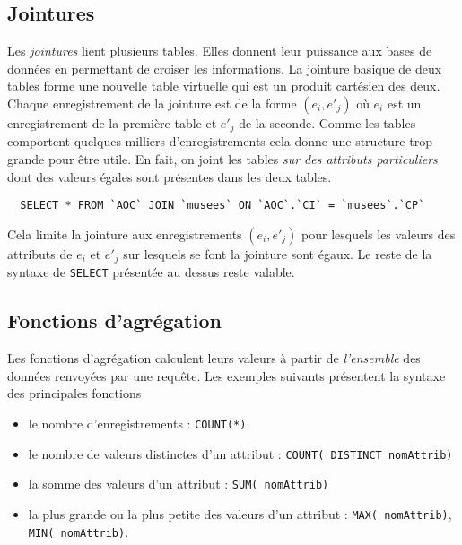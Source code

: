 \subsection{Jointures}
Les \emph{jointures} lient plusieurs tables. Elles donnent leur puissance aux bases de données en permettant de croiser les informations.\newline
La jointure basique de deux tables forme une nouvelle table virtuelle qui est un produit cartésien des deux. Chaque enregistrement de la jointure est de la forme $(e_i,e'_j)$ où $e_i$ est un enregistrement de la première table et $e'_j$ de la seconde. Comme les tables comportent quelques milliers d'enregistrements cela donne une structure trop grande pour être utile.\newline
En fait, on joint les tables \emph{sur des attributs particuliers} dont des valeurs égales sont présentes dans les deux tables.
\begin{verbatim}
  SELECT * FROM `AOC` JOIN `musees` ON `AOC`.`CI` = `musees`.`CP`
\end{verbatim}
Cela limite la jointure aux enregistrements $(e_i,e'_j)$ pour lesquels les valeurs des attributs de $e_i$ et $e'_j$ sur lesquels se font la jointure sont égaux.\newline
Le reste de la syntaxe de \verb|SELECT| présentée au dessus reste valable.

\subsection{Fonctions d'agrégation}
Les fonctions d'agrégation calculent leurs valeurs à partir de \emph{l'ensemble} des données renvoyées par une requête.\newline
Les exemples suivants présentent la syntaxe des principales fonctions 
\begin{itemize}
  \item le nombre d'enregistrements : \texttt{COUNT(*)}.
  \item le nombre de valeurs distinctes d'un attribut : \texttt{COUNT( DISTINCT nomAttrib)}
  \item la somme des valeurs d'un attribut : \texttt{SUM( nomAttrib)}
  \item la plus grande ou la plus petite des valeurs d'un attribut : \texttt{MAX( nomAttrib)}, \texttt{MIN( nomAttrib)}.
\end{itemize}



